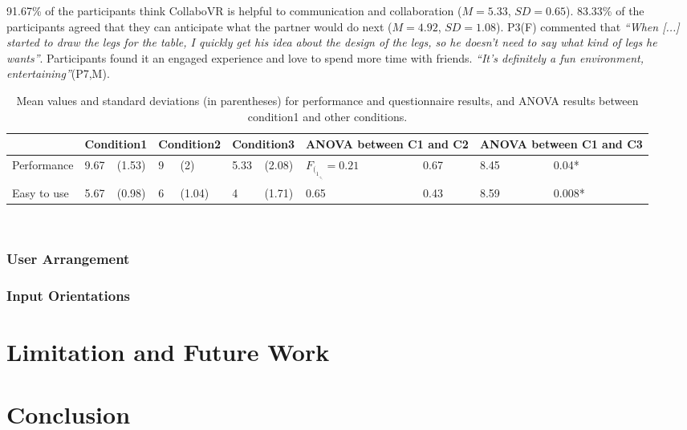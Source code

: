 \documentclass{sigchi}
\begin{document}
91.67\% of the participants think CollaboVR is helpful to communication and collaboration ($M=5.33$, $SD=0.65$). 
83.33\% of the participants agreed that they can anticipate what the partner would do next ($M=4.92$, $SD=1.08$). P3(F) commented that \textit{``When [...] started to draw the legs for the table, I quickly get his idea about the design of the legs, so he doesn't need to say what kind of legs he wants''}. Participants found it an engaged experience and love to spend more time with friends. \textit{``It's definitely a fun environment, entertaining''}(P7,M).

\begin{table}
  \centering
  \begin{tabular}{l l l l l l l l l l l}
    & \multicolumn{2}{c}{Condition1} & \multicolumn{2}{c}{Condition2} & \multicolumn{2}{c}{Condition3} & \multicolumn{2}{c}{ANOVA between C1 and C2} & \multicolumn{2}{c}{ANOVA between C1 and C3} \\
    \cmidrule
    Performance & 9.67 & (1.53) & 9 & (2) & 5.33 & (2.08) & $F_(_1_,_5_)=0.21$ & 0.67 & 8.45 & 0.04*\\
    Easy to use & 5.67 & (0.98) & 6 & (1.04) & 4 & (1.71) & 0.65 & 0.43 & 8.59 & 0.008*
  \end{tabular}
  \caption{Mean values and standard deviations (in parentheses) for performance and questionnaire results, and ANOVA results between condition1 and other conditions.}~\label{tab:result}
\end{table}
\subsubsection{User Arrangement}


\subsubsection{Input Orientations}


\section{Limitation and Future Work}

\section{Conclusion}


\end{document}
